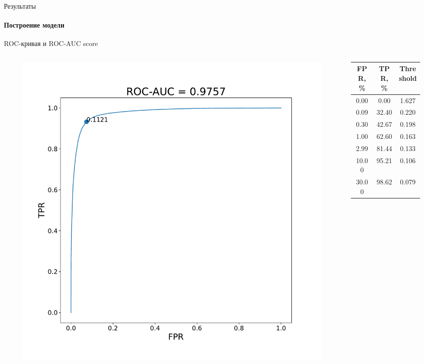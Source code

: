 \documentclass{beamer}
\begin{document}
\begin{frame}{Результаты}
\framesubtitle{Построение модели}
ROC-кривая и ROC-AUC score
\begin{columns}
\begin{column}{0.45\textwidth}
\begin{figure}[h!]
    \centering
    \includegraphics[scale=0.23]{roc_plot.pdf}
\end{figure}
\end{column}
\begin{column}{0.55\textwidth}
\begin{table}[h!]
    \centering
    \begin{tabular}{c|c|c}
   FPR, \% &    TPR, \% &  Threshold \\
\hline
  0.00 &   0.00 &   1.627 \\
  0.09 &  32.40 &    0.220 \\
  0.30 &  42.67 &   0.198 \\
  1.00 &  62.60 &   0.163 \\
  2.99 &  81.44 &   0.133 \\
 10.00 &  95.21 &   0.106 \\
 30.00 &  98.62 &   0.079\\
 \hline
\end{tabular}
\end{table}
\end{column}
\end{columns}
\end{frame}
\end{document}
